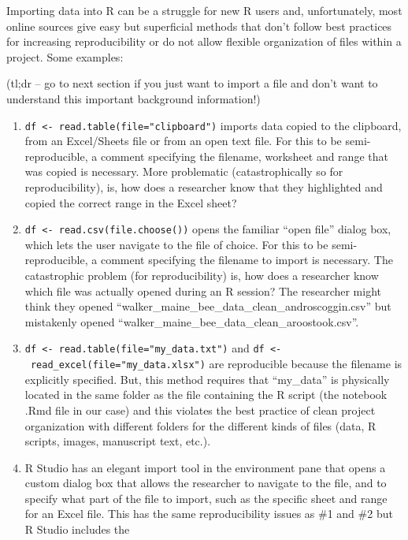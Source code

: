 \documentclass[]{book}
\providecommand{\tightlist}{%
  \setlength{\itemsep}{0pt}\setlength{\parskip}{0pt}}
\begin{document}
Importing data into R can be a struggle for new R users and,
unfortunately, most online sources give easy but superficial methods
that don't follow best practices for increasing reproducibility or do
not allow flexible organization of files within a project. Some
examples:

(tl;dr -- go to next section if you just want to import a file and don't
want to understand this important background information!)

\begin{enumerate}
\def\labelenumi{\arabic{enumi}.}
\tightlist
\item
  \texttt{df\ \textless{}-\ read.table(file="clipboard")} imports data
  copied to the clipboard, from an Excel/Sheets file or from an open
  text file. For this to be semi-reproducible, a comment specifying the
  filename, worksheet and range that was copied is necessary. More
  problematic (catastrophically so for reproducibility), is, how does a
  researcher know that they highlighted and copied the correct range in
  the Excel sheet?
\item
  \texttt{df\ \textless{}-\ read.csv(file.choose())} opens the familiar
  ``open file'' dialog box, which lets the user navigate to the file of
  choice. For this to be semi-reproducible, a comment specifying the
  filename to import is necessary. The catastrophic problem (for
  reproducibility) is, how does a researcher know which file was
  actually opened during an R session? The researcher might think they
  opened ``walker\_maine\_bee\_data\_clean\_androscoggin.csv'' but
  mistakenly opened ``walker\_maine\_bee\_data\_clean\_aroostook.csv''.
\item
  \texttt{df\ \textless{}-\ read.table(file="my\_data.txt")} and
  \texttt{df\ \textless{}-\ read\_excel(file="my\_data.xlsx")} are
  reproducible because the filename is explicitly specified. But, this
  method requires that ``my\_data'' is physically located in the same
  folder as the file containing the R script (the notebook .Rmd file in
  our case) and this violates the best practice of clean project
  organization with different folders for the different kinds of files
  (data, R scripts, images, manuscript text, etc.).
\item
  R Studio has an elegant import tool in the environment pane that opens
  a custom dialog box that allows the researcher to navigate to the
  file, and to specify what part of the file to import, such as the
  specific sheet and range for an Excel file. This has the same
  reproducibility issues as \#1 and \#2 but R Studio includes the

\end{enumerate}
\end{document}
